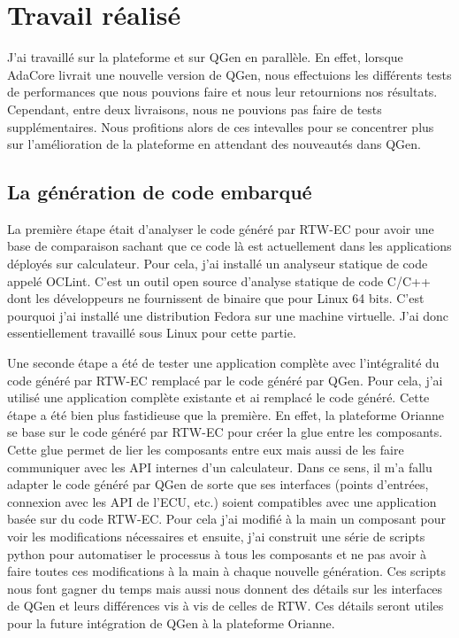 \chapter{Travail réalisé}
J'ai travaillé sur la plateforme et sur QGen en parallèle.
En effet, lorsque AdaCore livrait une nouvelle version de QGen, nous effectuions
les différents tests de performances que nous pouvions faire et nous leur
retournions nos résultats. Cependant, entre deux livraisons, nous ne pouvions pas
faire de tests supplémentaires. Nous profitions alors de ces intevalles pour se
concentrer plus sur l'amélioration de la plateforme en attendant des nouveautés
dans QGen.

\section{La génération de code embarqué}
La première étape était d'analyser le code généré par RTW-EC\up{\circledR} pour
avoir une base de comparaison sachant que ce code là est actuellement dans les
applications déployés sur calculateur.
Pour cela, j'ai installé un analyseur statique de code appelé OCLint. C'est un
outil open source d'analyse statique de code C/C++ dont les développeurs ne
fournissent de binaire que
pour Linux 64 bits. C'est pourquoi j'ai installé une distribution Fedora sur une machine
virtuelle. J'ai donc essentiellement travaillé sous Linux pour cette partie.

Une seconde étape a été de tester une application complète avec l'intégralité du
code généré par RTW-EC\up{\circledR} remplacé par le code généré par QGen. Pour
cela, j'ai utilisé une application complète existante et ai remplacé le code
généré. Cette étape a été bien plus fastidieuse que la première. En effet, la
plateforme Orianne se base sur le code généré par RTW-EC\up{\circledR} pour
créer la \og glue \fg{} entre les composants. Cette glue permet de lier les
composants entre eux mais aussi de les faire communiquer avec les API internes d'un
calculateur. Dans ce sens, il m'a fallu adapter
le code généré par QGen de sorte que ses interfaces (points d'entrées, connexion
avec les API de l'ECU, etc.) soient compatibles avec une application basée sur du
code RTW-EC\up{\circledR}. Pour cela j'ai modifié à la main un composant pour
voir les modifications nécessaires et ensuite, j'ai construit une série de
scripts python pour automatiser le processus à tous les composants et ne pas
avoir à faire toutes ces modifications à la main à chaque nouvelle génération.
Ces scripts nous font gagner du temps mais aussi nous donnent des détails sur les
interfaces de QGen et leurs différences vis à vis de celles de RTW. Ces détails
seront utiles pour la future intégration de QGen à la plateforme Orianne.

